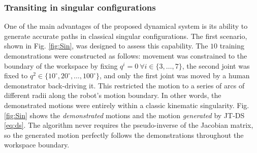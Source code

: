 \documentclass[letterpaper, 10 pt, conference,fleqn]{ieeeconf}
\begin{document}
\begin{table}[h]
	\vspace{0.1cm}
	\label{table:2}
	\centering
		\caption{  Each simulated trajectory is initialized at $q=[0~\dots~0]^T$. The convergence duration is the time required to move within $0.001$m of the target. The normalized convergence duration is the convergence duration divided by the distance between the initial and target positions.}
\end{table}




\subsubsection{Transiting in singular configurations}
One of the main advantages of the proposed dynamical system is its ability to generate accurate paths in classical singular configurations. The first scenario, shown in Fig. \ref{fig:Sin}, was designed to assess this capability. The $10$ training demonstrations were constructed as follows: movement was constrained to the boundary of the workspace by fixing $ q^i=0~\forall i\in\{3,\dots,7\}$, the second joint was fixed to $q^2\in\{10^\circ,20^\circ,\dots,100^\circ\}$, and only the first joint was moved by a human demonstrator back-driving it. This restricted the motion to a series of arcs of different radii along the robot's motion boundary. In other words, the demonstrated motions were entirely within a classic kinematic singularity. Fig. \ref{fig:Sin} shows the \textit{demonstrated} motions and the motion  \textit{generated} by JT-DS \eqref{eq:ds}. The algorithm never requires the pseudo-inverse of the Jacobian matrix, so the generated motion perfectly follows the demonstrations throughout the workspace boundary.
\end{document}
